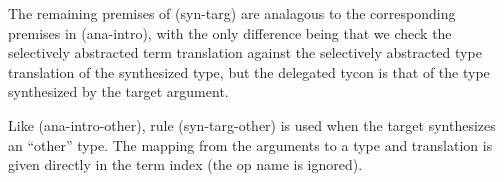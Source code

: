 \documentclass[10pt,preprint]{sigplanconf}
\newtheorem{lemma}{Lemma}
\newtheorem{definition}{Definition}
\begin{document}
The remaining premises of (syn-targ) are analagous to the corresponding premises in (ana-intro), with the only difference being that we check the selectively abstracted  term translation against the selectively abstracted type translation of the synthesized type, but the delegated tycon is that of the type synthesized by the target argument. 

Like (ana-intro-other), rule (syn-targ-other) is used when the target synthesizes an ``other'' type. The mapping from the arguments to a type and translation is given directly in the term index (the op name is ignored).






\end{document}
